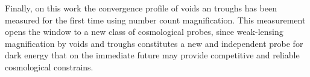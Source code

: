 Finally, on this work the convergence profile of voids an troughs has been measured for the first time using number count magnification. This measurement opens the window to a new class of cosmological probes, since weak-lensing magnification by voids and troughs constitutes a new and independent probe for dark energy that on the immediate future may provide competitive and reliable cosmological constrains.


